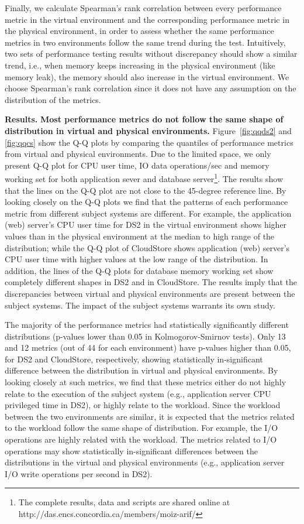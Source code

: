 \documentclass[smallextended]{svjour3}       %
\begin{document}
Finally, we calculate Spearman's rank correlation between every performance metric in the virtual environment and the corresponding performance metric in the physical environment, in order to assess whether the same performance metrics in two environments follow the same trend during the test. Intuitively, two sets of performance testing results without discrepancy should show a similar trend, i.e., when memory keeps increasing in the physical environment (like memory leak), the memory should also increase in the virtual environment. We choose Spearman's rank correlation since it does not have any assumption on the distribution of the metrics. 

\noindent \textbf{Results.}
\noindent \textbf{Most performance metrics do not follow the same shape of distribution in virtual and physical environments.} Figure~\ref{fig:qqds2} and \ref{fig:qqcs} show the Q-Q plots by comparing the quantiles of performance metrics from virtual and physical environments. Due to the limited space, we only present Q-Q plot for CPU user time, IO data operations/sec and memory working set for both application sever and database server\footnote{The complete results, data and scripts are shared online at http://das.encs.concordia.ca/members/moiz-arif/}. The results show that the lines on the Q-Q plot are not close to the 45-degree reference line. By looking closely on the Q-Q plots we find that the patterns of each performance metric from different subject systems are different. For example, the application (web) server's CPU user time for DS2 in the virtual environment shows higher values than in the physical environment at the median to high range of the distribution; while the Q-Q plot of CloudStore shows application (web) server's CPU user time with higher values at the low range of the distribution. In addition, the lines of the Q-Q plots for database memory working set show completely different shapes in DS2 and in CloudStore. The results imply that the discrepancies between virtual and physical environments are present between the subject systems. The impact of the subject systems warrants its own study.

The majority of the performance metrics had statistically significantly different distributions (p-values lower than 0.05 in Kolmogorov-Smirnov tests). Only 13 and 12 metrics (out of 44 for each environment) have p-values higher than 0.05, for DS2 and CloudStore, respectively, showing statistically in-significant difference between the distribution in virtual and physical environments. By looking closely at such metrics, we find that these metrics either do not highly relate to the execution of the subject system (e.g., application server CPU privileged time in DS2), or highly relate to the workload. Since the workload between the two environments are similar, it is expected that the metrics related to the workload follow the same shape of distribution. For example, the I/O operations are highly related with the workload. The metrics related to I/O operations may show statistically in-significant differences between the distributions in the virtual and physical environments (e.g., application server I/O write operations per second in DS2). %
\end{document}
